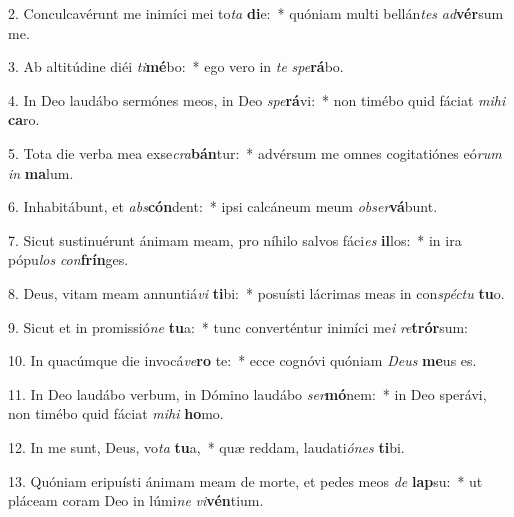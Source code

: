 2. Conculcavérunt me inimíci mei to\textit{ta} \textbf{di}e:~*  quóniam multi bellán\textit{tes} \textit{ad}\textbf{vér}sum me.\

3. Ab altitúdine diéi \textit{ti}\textbf{mé}bo:~*  ego vero in \textit{te} \textit{spe}\textbf{rá}bo.\

4. In Deo laudábo sermónes meos, in Deo \textit{spe}\textbf{rá}vi:~*  non timébo quid fáciat \textit{mi}\textit{hi} \textbf{ca}ro.\

5. Tota die verba mea exse\textit{cra}\textbf{bán}tur:~*  advérsum me omnes cogitatiónes eó\textit{rum} \textit{in} \textbf{ma}lum.\

6. Inhabitábunt, et \textit{abs}\textbf{cón}dent:~*  ipsi calcáneum meum \textit{ob}\textit{ser}\textbf{vá}bunt.\

7. Sicut sustinuérunt ánimam meam, pro níhilo salvos fáci\textit{es} \textbf{il}los:~*  in ira pópu\textit{los} \textit{con}\textbf{frín}ges.\

8. Deus, vitam meam annuntiá\textit{vi} \textbf{ti}bi:~*  posuísti lácrimas meas in con\textit{spéc}\textit{tu} \textbf{tu}o.\

9. Sicut et in promissió\textit{ne} \textbf{tu}a:~*  tunc converténtur inimíci me\textit{i} \textit{re}\textbf{trór}sum:\

10. In quacúmque die invocá\textit{ve}\textbf{ro} te:~*  ecce cognóvi quóniam \textit{De}\textit{us} \textbf{me}us es.\

11. In Deo laudábo verbum, in Dómino laudábo \textit{ser}\textbf{mó}nem:~*  in Deo sperávi, non timébo quid fáciat \textit{mi}\textit{hi} \textbf{ho}mo.\

12. In me sunt, Deus, vo\textit{ta} \textbf{tu}a,~*  quæ reddam, laudati\textit{ó}\textit{nes} \textbf{ti}bi.\

13. Quóniam eripuísti ánimam meam de morte, et pedes meos \textit{de} \textbf{lap}su:~*  ut pláceam coram Deo in lúmi\textit{ne} \textit{vi}\textbf{vén}tium.\

